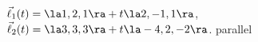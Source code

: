 {$\vec\ell_1(t) = \la 1,2,1\ra + t\la 2,-1,1\ra$,\\
$\vec\ell_2(t) = \la 3,3,3\ra + t\la -4,2,-2\ra$.
}
{parallel
}


